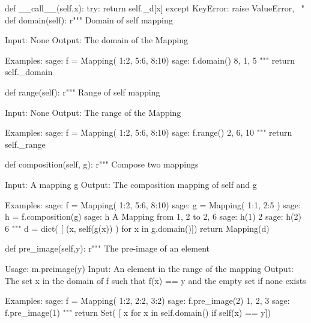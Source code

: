 \begin{sageblock}
        def __call__(self,x):
                try: 
                        return self._d[x]
                except KeyError:
                        raise ValueError, \
                        "%
        def domain(self):
                r"""
                Domain of self mapping

                Input: None
                Output: The domain of the Mapping

                Examples:
                       sage: f = Mapping({ 1:2, 5:6, 8:10})
                       sage: f.domain()
                       {8, 1, 5}        
                """
                return self._domain

        def range(self):
                r"""
                Range of self mapping

                Input: None
                Output: The range of the Mapping

                Examples:
                       sage: f = Mapping({ 1:2, 5:6, 8:10})
                       sage: f.range()
                       {2, 6, 10}
                """
                return self._range

        def composition(self, g):
                r"""
                Compose two mappings

                Input: A mapping g
                Output: The composition mapping of self and g

                Examples:
                       sage: f = Mapping({ 1:2, 5:6, 8:10})
                       sage: g = Mapping( {  1:1, 2:5 } )
                       sage: h = f.composition(g)
                       sage: h
                       A Mapping from {1, 2} to {2, 6}
                       sage: h(1)
                       2
                       sage: h(2)
                       6
                """
                d = dict( [ (x, self(g(x)) ) for x in g.domain()])
                return Mapping(d)

        def pre_image(self,y):
                r"""
                The pre-image of an element
                
                Usage: m.preimage(y)
                Input: An element in the range of the mapping
                Output: The set x in the domain of f such that 
                f(x) == y and the empty set if none exists
                
                Examples:
                       sage: f = Mapping( {1:2, 2:2, 3:2})
                       sage: f.pre_image(2)
                       {1, 2, 3}
                       sage: f.pre_image(1)
                       {}
                """
                return Set( [ x for x in self.domain() if self(x) == y])


\end{sageblock}
